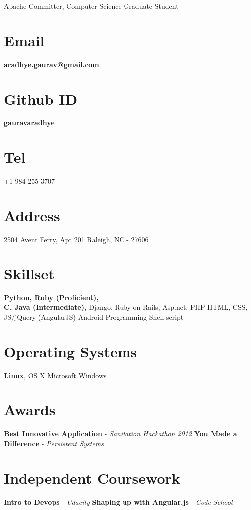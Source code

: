 \documentclass[]{friggeri-cv}
\begin{document}
      {Apache Committer, Computer Science Graduate Student}
      
\noindent\hspace{-0.16\textwidth}\makebox[\linewidth]{\rule{19.5cm}{0.4pt}}

\begin{aside}
\vspace{28 mm} \leavevmode
  \section{Email}
    \textbf{aradhye.gaurav@gmail.com}
    ~
  \section{Github ID}
    \textbf{gauravaradhye}
    ~
  \section{Tel}
    +1 984-255-3707
    ~
  \section{Address}
    2504 Avent Ferry, Apt 201
    Raleigh, NC - 27606
    ~
  \section{Skillset}
        \textbf{Python, Ruby (Proficient),\\ C, Java (Intermediate),}
        Django, Ruby on Rails, \leavevmode
        Asp.net, PHP
        HTML, CSS, JS/jQuery (AngularJS)
        Android Programming
        Shell script
~
  \section{Operating Systems}
        \textbf{Linux}, OS X\leavevmode
        Microsoft Windows
~
  \section{Awards}
        \textbf{Best Innovative Application} -
        \emph{Sanitation Hackathon 2012}
        \vspace{1mm} \leavevmode
        \textbf{You Made a Difference} -
        \emph{Persistent Systems}
~

  \section{Independent Coursework}
        \textbf{Intro to Devops} -
        \emph{Udacity}
        \vspace{1mm} \leavevmode
        \textbf{Shaping up with Angular.js} -
        \emph{Code School}
~
\end{aside}
\leavevmode
\vspace{3mm}
\end{document}
